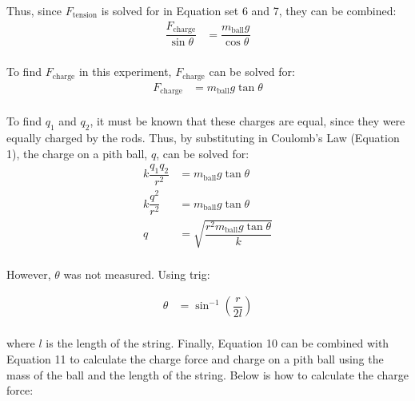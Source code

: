 \documentclass [12pt, letterpaper, twoside] {article}
\begin{document}
\begin{enumerate}
    \noindent
    Thus, since \(F_{\text{tension}}\) is solved for in Equation set 6 and 7, they can be combined:
    \begin{equation}
      \begin{split}
        \dfrac{F_{\text{charge}}}{\sin{\theta}} &= \dfrac{m_{\text{ball}}g}{\cos{\theta}} \\
      \end{split}
    \end{equation}

    \noindent
    To find \(F_{\text{charge}}\) in this experiment, \(F_{\text{charge}}\) can be solved for:
    \begin{equation}
      \begin{split} 
        F_{\text{charge}} &= m_{\text{ball}}g\tan{\theta} \\
      \end{split}
    \end{equation}

    \noindent
    To find \(q_{1}\) and \(q_{2}\), it must be known that these charges are equal, since they were equally charged by the rods. Thus, by substituting in Coulomb's Law (Equation 1), the charge on a pith ball, \(q\), can be solved for:
    \begin{equation}
      \begin{split}
        k\dfrac{q_{1}q_{2}}{r^2} &= m_{\text{ball}}g\tan{\theta} \\
        k\dfrac{q^2}{r^2} &= m_{\text{ball}}g\tan{\theta} \\
        q &= \sqrt{\dfrac{r^{2}m_{\text{ball}}g\tan{\theta}}{k}} \\
      \end{split}
    \end{equation}

    \noindent
    However, \(\theta\) was not measured. Using trig:

    \begin{equation}
      \begin{split}
        \theta &= \sin^{-1}\left(\dfrac{r}{2l}\right) \\
      \end{split}
    \end{equation}

    \noindent
    where \(l\) is the length of the string. Finally, Equation 10 can be combined with Equation 11 to calculate the charge force and charge on a pith ball using the mass of the ball and the length of the string. Below is how to calculate the charge force:


\end{enumerate}
\end{document}
